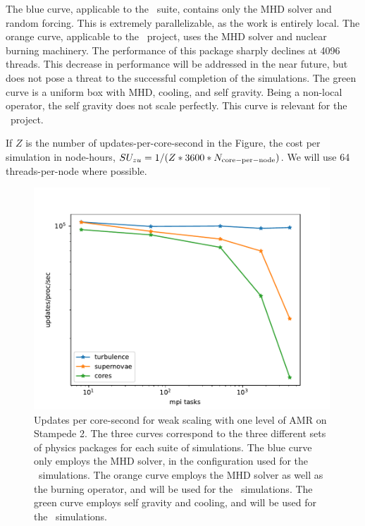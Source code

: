 \documentclass[11pt]{NSF}  %
\begin{document}
The blue curve, applicable to the \nameTurbulence\ suite, contains only the MHD
solver and random forcing.  This is extremely parallelizable, as the work is
entirely local.  The orange curve, applicable to the \nameSupernova\ project,
uses the MHD solver and nuclear burning machinery.  The performance of this
package sharply declines at 4096 threads.  
This decrease in performance will be
addressed in the near future, but does not pose a threat to the successful
completion of the simulations.  The green curve is a uniform box with MHD,
cooling, and self gravity.  Being a non-local operator, the self gravity does
not scale perfectly.  This curve is relevant for the \nameCores\ project.

If $Z$ is the number of updates-per-core-second in the Figure, the cost per
simulation in node-hours, $SU_{zu}=1/(Z*3600*N_{\rm{core-per-node}})$.  We will
use 64 threads-per-node where possible.  

\begin{figure} \begin{center}
    \includegraphics[width=0.99\textwidth]{g40_zoneup.pdf}
\caption[ ]{Updates per core-second for weak scaling with one level of AMR on
    Stampede 2.    The three curves correspond to the three different sets of
    physics packages for each suite of simulations.  The blue curve only employs
    the MHD solver, in the configuration used for the \nameTurbulence\
    simulations.  The orange curve employs the MHD solver as well as the burning
    operator, and will be used for the \nameSupernova\ simulations.  The green
    curve employs self gravity and cooling, and will be used for the \nameCores\
    simulations.
    }
\label{fig.scaling} \end{center} \end{figure}




\end{document}
